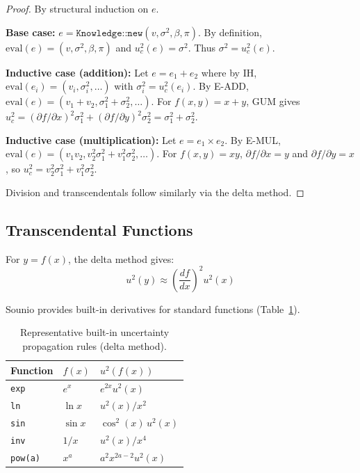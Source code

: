 \documentclass[journal]{IEEEtran}
\begin{document}
\begin{proof}
By structural induction on $e$.

\textbf{Base case:}
$e = \texttt{Knowledge::new}(v, \sigma^2, \beta, \pi)$.
By definition, $\text{eval}(e) = (v, \sigma^2, \beta, \pi)$ and
$u_c^2(e) = \sigma^2$. Thus $\sigma^2 = u_c^2(e)$.

\textbf{Inductive case (addition):} Let $e = e_1 + e_2$ where by IH,
$\text{eval}(e_i) = (v_i, \sigma_i^2, \ldots)$ with
$\sigma_i^2 = u_c^2(e_i)$. By E-ADD,
$\text{eval}(e) = (v_1{+}v_2, \sigma_1^2{+}\sigma_2^2, \ldots)$.
For $f(x,y) = x+y$, GUM gives
$u_c^2 = (\partial f/\partial x)^2 \sigma_1^2 +
(\partial f/\partial y)^2 \sigma_2^2 = \sigma_1^2 + \sigma_2^2$.
\checkmark

\textbf{Inductive case (multiplication):} Let $e = e_1 \times e_2$.
By E-MUL,
$\text{eval}(e) = (v_1 v_2, v_2^2\sigma_1^2 + v_1^2\sigma_2^2, \ldots)$.
For $f(x,y) = xy$, $\partial f/\partial x = y$ and
$\partial f/\partial y = x$, so
$u_c^2 = v_2^2\sigma_1^2 + v_1^2\sigma_2^2$. \checkmark

Division and transcendentals follow similarly via the delta method.
\end{proof}

\subsection{Transcendental Functions}

For $y = f(x)$, the delta method gives:
\[
  u^2(y) \approx \left(\frac{df}{dx}\right)^2 u^2(x)
\]

Sounio provides built-in derivatives for standard functions
(Table~\ref{tab:transcendental}).

\begin{table}[!t]
\caption{Representative built-in uncertainty propagation rules (delta method).}
\label{tab:transcendental}
\centering
\begin{tabular}{lll}
\toprule
Function & $f(x)$ & $u^2(f(x))$ \\
\midrule
\texttt{exp} & $e^x$ & $e^{2x} u^2(x)$ \\
\texttt{ln} & $\ln x$ & $u^2(x)/x^2$ \\
\texttt{sin} & $\sin x$ & $\cos^2(x)\, u^2(x)$ \\
\texttt{inv} & $1/x$ & $u^2(x)/x^4$ \\
\texttt{pow(a)} & $x^a$ & $a^2x^{2a-2}u^2(x)$ \\
\bottomrule
\end{tabular}
\end{table}
\end{document}
